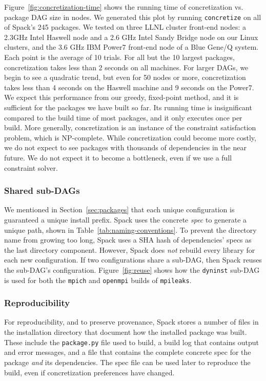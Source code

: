 Figure~\ref{fig:concretization-time} shows the running time of concretization vs.
package DAG size in nodes.  We generated this plot by running {\tt concretize}
on all of Spack's 245 packages. We tested on three LLNL cluster front-end nodes:
a 2.3GHz Intel Haswell node and a 2.6 GHz Intel Sandy Bridge node on our Linux
clusters, and the 3.6 GHz IBM Power7 front-end node of a Blue Gene/Q system.
Each point is the average of 10 trials.  For all but the 10
largest packages, concretization takes less than 2 seconds on all machines.
For larger DAGs, we begin to see a quadratic trend, but even for 50 nodes or more,
concretization takes less than 4 seconds on the Haswell machine and 9 seconds on the
Power7.
%
We expect this performance from our greedy, fixed-point method, and
it is sufficient for the packages we have built so far.
Its running time is insignificant compared to the build time of
most packages, and it only executes
once per build.
More generally, concretization is an instance of the constraint
satisfaction problem, which is NP-complete. While concretization could become
more costly, we do not expect to see packages with
thousands of dependencies in the near future. We do not expect
it to become a bottleneck, even if we use a full constraint solver.

\subsubsection{Shared sub-DAGs}
\label{sec:directory-layout}

We mentioned in Section~\ref{sec:packages} that each unique configuration is
guaranteed a unique install prefix. Spack uses the concrete {\it spec}
to generate a unique path, shown in Table~\ref{tab:naming-conventions}.
To prevent the directory name from growing too long, Spack uses a SHA hash of
dependencies' specs as the last directory component.  However, Spack
does {\it not} rebuild every library for each new configuration.
If two configurations share a sub-DAG, then Spack reuses the sub-DAG's 
configuration.  Figure~\ref{fig:reuse} shows how the {\tt dyninst} sub-DAG 
is used for both the {\tt mpich} and {\tt openmpi} builds of {\tt mpileaks}.


\subsubsection{Reproducibility}


For reproducibility, and to preserve provenance, Spack stores a number of
files in the installation directory that document how the installed package was
built.  These include the {\tt package.py} file used to build, a build log
that contains output and error messages, and a file that contains the complete
concrete spec for the package {\it and} its dependencies. The spec file can be
used later to reproduce the build, even if concretization preferences have 
changed.


